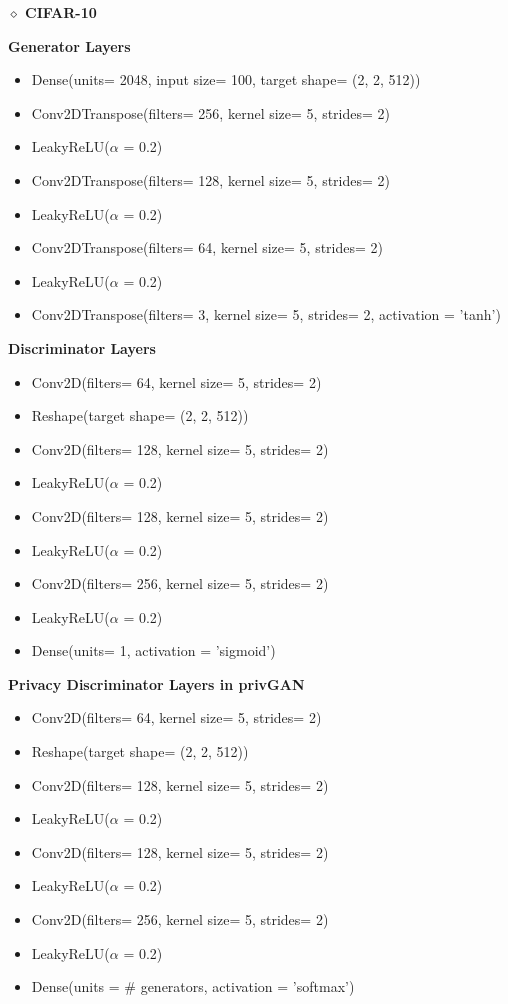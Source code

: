 \textbf{$\diamond$ CIFAR-10}

\textbf{Generator Layers}
\begin{itemize}

\item Dense(units= 2048, input size= 100, target shape=
(2, 2, 512))
\item Conv2DTranspose(filters= 256, kernel size= 5,
strides= 2)
\item LeakyReLU($\alpha$ = 0.2)
\item  Conv2DTranspose(filters= 128, kernel size= 5,
strides= 2)
\item LeakyReLU($\alpha$ = 0.2)
\item Conv2DTranspose(filters= 64, kernel size= 5,
strides= 2)
\item LeakyReLU($\alpha$ = 0.2)
\item Conv2DTranspose(filters= 3, kernel size= 5, strides=
2, activation = ’tanh’)
\end{itemize}

\textbf{Discriminator Layers}
\begin{itemize}

\item Conv2D(filters= 64, kernel size= 5, strides= 2)
\item Reshape(target shape= (2, 2, 512))
\item Conv2D(filters= 128, kernel size= 5, strides= 2)
\item LeakyReLU($\alpha$ = 0.2)
\item Conv2D(filters= 128, kernel size= 5, strides= 2)
\item LeakyReLU($\alpha$ = 0.2)
\item Conv2D(filters= 256, kernel size= 5, strides= 2)
\item LeakyReLU($\alpha$ = 0.2)
\item Dense(units= 1, activation = ’sigmoid’)
\end{itemize}

\textbf{Privacy Discriminator Layers in privGAN}
\begin{itemize}

\item Conv2D(filters= 64, kernel size= 5, strides= 2)
\item Reshape(target shape= (2, 2, 512))
\item Conv2D(filters= 128, kernel size= 5, strides= 2)
\item LeakyReLU($\alpha$ = 0.2)
\item Conv2D(filters= 128, kernel size= 5, strides= 2)
\item LeakyReLU($\alpha$ = 0.2)
\item Conv2D(filters= 256, kernel size= 5, strides= 2)
\item LeakyReLU($\alpha$ = 0.2)
\item Dense(units = \# generators, activation =
’softmax’)

\end{itemize}

